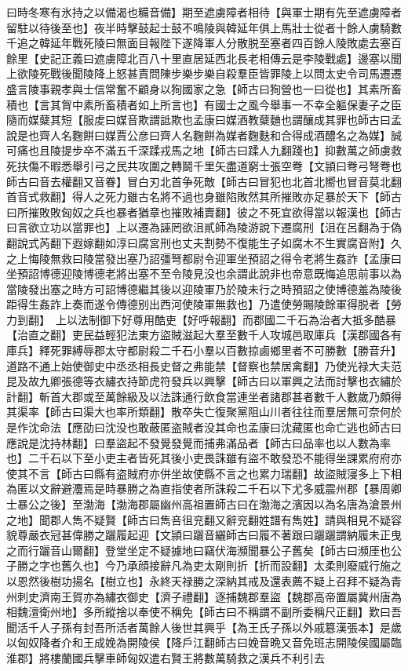 曰時冬寒有氷持之以備渴也糒音備】期至遮虜障者相待【與軍士期有先至遮虜障者留駐以待後至也】夜半時擊鼓起士鼓不鳴陵與韓延年俱上馬壯士從者十餘人虜騎數千追之韓延年戰死陵曰無面目報陛下遂降軍人分散脱至塞者四百餘人陵敗處去塞百餘里【史記正義曰遮虜障北百八十里直居延西北長老相傳云是李陵戰處】邊塞以聞上欲陵死戰後聞陵降上怒甚責問陳步樂步樂自殺羣臣皆罪陵上以問太史令司馬遷遷盛言陵事親孝與士信常奮不顧身以狥國家之急【師古曰狥營也一曰從也】其素所畜積也【言其胷中素所畜積者如上所言也】有國士之風今舉事一不幸全軀保妻子之臣隨而媒糵其短【服䖍曰媒音欺謂詆欺也孟康曰媒酒教糵麯也謂釀成其罪也師古曰孟說是也齊人名麴餅曰媒賈公彦曰齊人名麴餅為媒者麴麩和合得成酒醴名之為媒】誠可痛也且陵提步卒不滿五千深蹂戎馬之地【師古曰蹂人九翻踐也】抑數萬之師虜救死扶傷不暇悉舉引弓之民共攻圍之轉鬬千里矢盡道窮士張空弮【文頴曰弮弓弩弮也師古曰音去權翻又音眷】冒白刃北首争死敵【師古曰冒犯也北首北嚮也冒音莫北翻首音式救翻】得人之死力雖古名將不過也身雖陷敗然其所摧敗亦足暴於天下【師古曰所摧敗敗匈奴之兵也暴者猶章也摧敗補賣翻】彼之不死宜欲得當以報漢也【師古曰言欲立功以當罪也】上以遷為誣罔欲沮貳師為陵游說下遷腐刑【沮在呂翻為于偽翻說式芮翻下遐嫁翻如淳曰腐宮刑也丈夫割勢不復能生子如腐木不生實腐音附】久之上悔陵無救曰陵當發出塞乃詔彊弩都尉令迎軍坐預詔之得令老將生姦詐【孟康曰坐預詔博德迎陵博德老將出塞不至令陵見没也余謂此說非也帝意既悔追思前事以為當陵發出塞之時方可詔博德繼其後以迎陵軍乃於陵未行之時預詔之使博德羞為陵後距得生姦詐上奏而遂令傳德别出西河使陵軍無救也】乃遣使勞賜陵餘軍得脱者【勞力到翻】　上以法制御下好尊用酷吏【好呼報翻】而郡國二千石為治者大抵多酷暴【治直之翻】吏民益輕犯法東方盜賊滋起大羣至數千人攻城邑取庫兵【漢郡國各有庫兵】釋死罪縛辱郡太守都尉殺二千石小羣以百數掠鹵鄉里者不可勝數【勝音升】道路不通上始使御史中丞丞相長史督之弗能禁【督察也禁居禽翻】乃使光禄大夫范昆及故九卿張德等衣繡衣持節虎符發兵以興擊【師古曰以軍興之法而討擊也衣繡於計翻】斬首大郡或至萬餘級及以法誅通行飲食當連坐者諸郡甚者數千人數歲乃頗得其渠率【師古曰渠大也率所類翻】散卒失亡復聚黨阻山川者往往而羣居無可奈何於是作沈命法【應劭曰沈没也敢蔽匿盗賊者没其命也孟康曰沈藏匿也命亡逃也師古曰應說是沈持林翻】曰羣盜起不發覺發覺而捕弗滿品者【師古曰品率也以人數為率也】二千石以下至小吏主者皆死其後小吏畏誅雖有盜不敢發恐不能得坐課累府府亦使其不言【師古曰縣有盗賊府亦併坐故使縣不言之也累力瑞翻】故盜賊寖多上下相為匿以文辭避灋焉是時暴勝之為直指使者所誅殺二千石以下尤多威震州郡【暴周卿士暴公之後】至渤海【渤海郡屬幽州高祖置師古曰在渤海之濱因以為名唐為滄景州之地】聞郡人雋不疑賢【師古曰雋咅徂兖翻又辭兖翻姓譜有雋姓】請與相見不疑容貌尊嚴衣冠甚偉勝之躧履起迎【文頴曰躧音纚師古曰履不著跟曰躧躧謂納履未正曳之而行躧音山爾翻】登堂坐定不疑據地曰竊伏海瀕聞暴公子舊矣【師古曰瀕厓也公子勝之字也舊久也】今乃承顔接辭凡為吏太剛則折【折而設翻】太柔則廢威行施之以恩然後樹功揚名【樹立也】永終天禄勝之深納其戒及還表薦不疑上召拜不疑為青州刺史濟南王賀亦為繡衣御史【濟子禮翻】逐捕魏郡羣盜【魏郡高帝置屬冀州唐為相魏澶衛州地】多所縱捨以奉使不稱免【師古曰不稱謂不副所委稱尺正翻】歎曰吾聞活千人子孫有封吾所活者萬餘人後世其興乎【為王氏子孫以外戚簒漢張本】是歲以匈奴降者介和王成娩為開陵侯【降戶江翻師古曰娩音晩又音免班志開陵侯國屬臨淮郡】將樓蘭國兵擊車師匈奴遣右賢王將數萬騎救之漢兵不利引去

